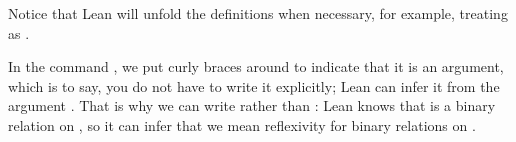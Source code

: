 \documentclass[letterpaper,10pt,english]{sphinxmanual}
\begin{document}
\sphinxAtStartPar
Notice that Lean will unfold the definitions when necessary,
for example, treating  as .

\begin{sphinxVerbatim}[commandchars=\\\{\}]
       

              

                  
   

                    
     
     

             
         
     
    
\end{sphinxVerbatim}

\sphinxAtStartPar
In the command ,
we put curly braces around  to indicate that it is an  argument,
which is to say, you do not have to write it explicitly;
Lean can infer it from the argument .
That is why we can write  rather than :
Lean knows that  is a binary relation on ,
so it can infer that we mean reflexivity for binary relations on .
\end{document}
